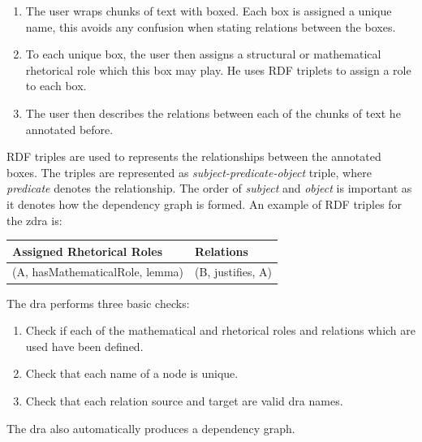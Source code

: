 \begin{enumerate}
\item The user wraps chunks of text with boxed. Each box is assigned a unique name, this avoids any confusion when stating relations between the boxes.

\item To each unique box, the user then assigns a structural or mathematical rhetorical role which this box may play. He uses RDF triplets to assign a role to each box.

\item The user then describes the relations between each of the chunks of text he annotated before.
\end{enumerate}

RDF triples \cite{Candan:2001:RDF:507533.507536} are used to represents the relationships between the annotated boxes. The triples are represented as \emph{subject-predicate-object} triple, where \emph{predicate} denotes the relationship. The order of \emph{subject} and \emph{object} is important as it denotes how the dependency graph is formed. An example of RDF triples for the \gls{zdra} is:

\begin{table}[H]
\centering
\begin{tabular}{|l|l|}
\hline
\textbf{Assigned Rhetorical Roles} & \textbf{Relations} \\ 
\hline
(A, hasMathematicalRole, lemma) & (B, justifies, A) \\
\hline
\end{tabular}
\end{table}

The \gls{dra} performs three basic checks:

\begin{enumerate}
\item Check if each of the mathematical and rhetorical roles and relations which are used have been defined.

\item Check that each name of a node is unique.

\item Check that each relation source and target are valid \gls{dra} names.
\end{enumerate}

The \gls{dra} also automatically produces a dependency graph.


